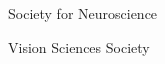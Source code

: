 
\fontsize{9pt}{1em}\bodyfontlight\upshape\color{text}
\vspace{2mm}

\begin{cvitems}
    \item {Society for Neuroscience}
    \item {Vision Sciences Society}
\end{cvitems}

\vspace{2mm}